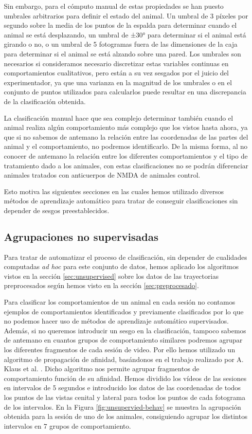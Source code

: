 Sin embargo, para el cómputo manual de estas propiedades se han puesto umbrales arbitrarios para definir el estado del animal. Un umbral de 3 píxeles por segundo sobre la media de los puntos de la espalda para determinar cuando el animal se está desplazando, un umbral de ±30° para determinar si el animal está girando o no, o un umbral de 5 fotogramas fuera de las dimensiones de la caja para determinar si el animal se está alzando sobre una pared. Los umbrales son necesarios si consideramos necesario discretizar estas variables continuas en comportamientos cualitativos, pero están a su vez sesgados por el juicio del experimentador, ya que una varianza en la magnitud de los umbrales o en el conjunto de puntos utilizados para calcularlos puede resultar en una discrepancia de la clasificación obtenida.

La clasificación manual hace que sea complejo determinar también cuando el animal realiza algún comportamiento más complejo que los vistos hasta ahora, ya que si no sabemos de antemano la relación entre las coordenadas de las partes del animal y el comportamiento, no podremos identificarlo. De la misma forma, al no conocer de antemano la relación entre los diferentes comportamientos y el tipo de tratamiento dado a los animales, con estas clasificaciones no se podrán diferenciar animales tratados con anticuerpos de NMDA de animales control.

Esto motiva las siguientes secciones en las cuales hemos utilizado diversos métodos de aprendizaje automático para tratar de conseguir clasificaciones sin depender de sesgos preestablecidos.

\subsection{Agrupaciones no supervisadas}
Para tratar de automatizar el proceso de clasificación, sin depender de cualidades computadas \textit{ad hoc} para este conjunto de datos, hemos aplicado los algoritmos vistos en la sección \ref{sec:unsupervised} sobre los datos de las trayectorias preprocesados según hemos visto en la sección \ref{sec:preprocesado}.

Para clasificar los comportamientos de un animal en cada sesión no contamos ejemplos de comportamientos identificados y previamente clasificados por lo que no podemos hacer uso de métodos de aprendizaje automático supervisados. Además, si no queremos introducir un sesgo en la clasificación, tampoco sabemos de antemano en cuantos grupos de comportamiento similares podremos agrupar los diferentes fragmentos de cada sesión de video. Por ello hemos utilizado un algoritmo de propagación de afinidad, basándonos en el trabajo realizado por A. Klaus et al. \cite{neuron}. Dicho algoritmo nos permite agrupar fragmentos de comportamiento función de su afinidad. Hemos dividido los vídeos de las sesiones en intervalos de 5 segundos e introducido los datos de las coordenadas de todos los puntos de las vistas cenital y lateral para todos los puntos de cada fotograma de los intervalos. En la Figura \ref{fig:unsupervied-behav} se muestra la agrupación obtenida para la sesión de uno de los animales, consiguiendo agrupar los distintos intervalos en 7 grupos de comportamiento.

